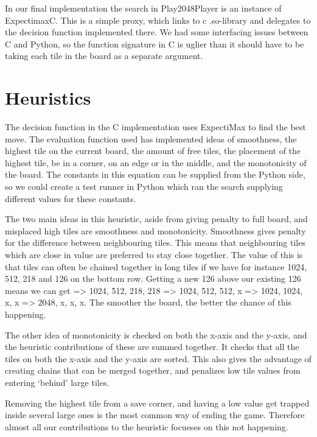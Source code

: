 In our final implementation the search in Play2048Player is an instance of
ExpectimaxC. This is a simple proxy, which links to c .so-library and delegates
to the decision function implemented there. We had some interfacing issues between
C and Python, so the function signature in C is uglier than it should have to
be taking each tile in the board as a separate argument.



\section{Heuristics}

The decision function in the C implementation uses ExpectiMax to find the best move.
The evaluation function used has implemented ideas of smoothness, the highest tile
on the current board, the amount of free tiles, the placement of the highest tile,
be in a corner, on an edge or in the middle, and the monotonicity of the board.
The constants in this equation can be supplied from the Python side, so we
could create a test runner in Python which ran the search supplying different
values for these constants.

The two main ideas in this heuristic, aside from giving penalty to full board, and
misplaced high tiles are smoothness and monotonicity. Smoothness gives penalty
for the difference between neighbouring tiles. This means that neighbouring tiles
which are close in value are preferred to stay close together. The value of this is
that tiles can often be chained together in long tiles if we have for instance
1024, 512, 218 and 126 on the bottom row. Getting a new 126 above our existing 126
means we can get => 1024, 512, 218, 218 => 1024, 512, 512, x => 1024, 1024, x, x =>
2048, x, x, x. The smoother the board, the better the chance of this happening.

The other idea of monotonicity is checked on both the x-axis and the y-axis, and
the heuristic contributions of these are summed together. It checks that all the tiles
on both the x-axis and the y-axis are sorted. This also gives the advantage of
creating chains that can be merged together, and penalizes low tile values from
entering `behind' large tiles.

Removing the highest tile from a save corner, and having a low value get trapped
inside several large ones is the most common way of ending the game. Therefore
almost all our contributions to the heuristic focueses on this not happening.

